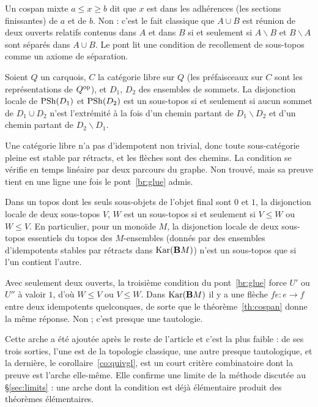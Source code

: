\noindent Un cospan mixte $a\le x\ge b$ dit que $x$ est dans les adhérences (les sections finissantes) de $a$ et de $b$. \status{} Non : c'est le fait classique que $A\cup B$ est réunion de deux ouverts relatifs contenus dans $A$ et dans $B$ si et seulement si $A\smallsetminus B$ et $B\smallsetminus A$ sont séparés dans $A\cup B$. Le pont lit une condition de recollement de sous-topos comme un axiome de séparation.

\begin{corollary}[Carquois]\label{co:quivgl}
Soient $Q$ un carquois, $C$ la catégorie libre sur $Q$ (les préfaisceaux sur $C$ sont les représentations de $Q^{\mathrm{op}}$), et $D_1$, $D_2$ des ensembles de sommets. La disjonction locale de $\mathrm{PSh}(D_1)$ et $\mathrm{PSh}(D_2)$ est un sous-topos si et seulement si aucun sommet de $D_1\cup D_2$ n'est l'extrémité à la fois d'un chemin partant de $D_1\smallsetminus D_2$ et d'un chemin partant de $D_2\smallsetminus D_1$.
\end{corollary}

\noindent Une catégorie libre n'a pas d'idempotent non trivial, donc toute sous-catégorie pleine est stable par rétracts, et les flèches sont des chemins. La condition se vérifie en temps linéaire par deux parcours du graphe. \status{} Non trouvé, mais sa preuve tient en une ligne une fois le pont~\ref{br:glue} admis.

\begin{corollary}\label{co:twovalued}
Dans un topos dont les seuls sous-objets de l'objet final sont $0$ et $1$, la disjonction locale de deux sous-topos $V$, $W$ est un sous-topos si et seulement si $V\le W$ ou $W\le V$. En particulier, pour un monoïde $M$, la disjonction locale de deux sous-topos essentiels du topos des $M$-ensembles (donnés par des ensembles d'idempotents stables par rétracts dans $\operatorname{Kar}(\mathbf{B} M)$) n'est un sous-topos que si l'un contient l'autre.
\end{corollary}

\noindent Avec seulement deux ouverts, la troisième condition du pont~\ref{br:glue} force $U'$ ou $U''$ à valoir $1$, d'où $W\le V$ ou $V\le W$. Dans $\operatorname{Kar}(\mathbf{B} M)$ il y a une flèche $fe\colon e\to f$ entre deux idempotents quelconques, de sorte que le théorème~\ref{th:cospan} donne la même réponse. \status{} Non ; c'est presque une tautologie.

\begin{remark}
Cette arche a été ajoutée après le reste de l'article et c'est la plus faible : de ses trois sorties, l'une est de la topologie classique, une autre presque tautologique, et la dernière, le corollaire~\ref{co:quivgl}, est un court critère combinatoire dont la preuve est l'arche elle-même. Elle confirme une limite de la méthode discutée au \S\ref{sec:limits} : une arche dont la condition est déjà élémentaire produit des théorèmes élémentaires.
\end{remark}
